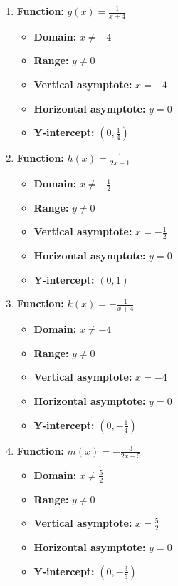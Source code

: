 \documentclass{article}
\begin{document}
\begin{itemize}
\begin{enumerate}[label=\alph*)]
        \item \textbf{Function:} $g(x) = \frac{1}{x+4}$
            \begin{itemize}
                \item \textbf{Domain:} $x \neq -4$
                \item \textbf{Range:} $y \neq 0$
                \item \textbf{Vertical asymptote:} $x = -4$
                \item \textbf{Horizontal asymptote:} $y = 0$
                \item \textbf{Y-intercept:} $(0, \frac{1}{4})$
            \end{itemize}
        
        \item \textbf{Function:} $h(x) = \frac{1}{2x+1}$
            \begin{itemize}
                \item \textbf{Domain:} $x \neq -\frac{1}{2}$
                \item \textbf{Range:} $y \neq 0$
                \item \textbf{Vertical asymptote:} $x = -\frac{1}{2}$
                \item \textbf{Horizontal asymptote:} $y = 0$
                \item \textbf{Y-intercept:} $(0, 1)$
            \end{itemize}
        
        \item \textbf{Function:} $k(x) = -\frac{1}{x+4}$
            \begin{itemize}
                \item \textbf{Domain:} $x \neq -4$
                \item \textbf{Range:} $y \neq 0$
                \item \textbf{Vertical asymptote:} $x = -4$
                \item \textbf{Horizontal asymptote:} $y = 0$
                \item \textbf{Y-intercept:} $(0, -\frac{1}{4})$
            \end{itemize}
        
        \item \textbf{Function:} $m(x) = -\frac{3}{2x-5}$
            \begin{itemize}
                \item \textbf{Domain:} $x \neq \frac{5}{2}$
                \item \textbf{Range:} $y \neq 0$
                \item \textbf{Vertical asymptote:} $x = \frac{5}{2}$
                \item \textbf{Horizontal asymptote:} $y = 0$
                \item \textbf{Y-intercept:} $(0, -\frac{3}{5})$
            \end{itemize}
        

\end{enumerate}
\end{itemize}
\end{document}
